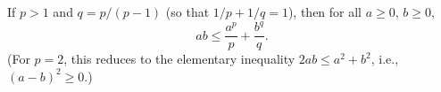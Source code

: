 If $p > 1$ and $q = p/(p-1)$ (so that $1/p + 1/q = 1$), then for all $a \geq 0$, $b \geq 0$,
$$ab \leq \frac{a^p}{p} + \frac{b^q}{q}.$$
(For $p = 2$, this reduces to the elementary inequality $2ab \leq a^2 + b^2$, i.e., $(a-b)^2 \geq 0$.)
